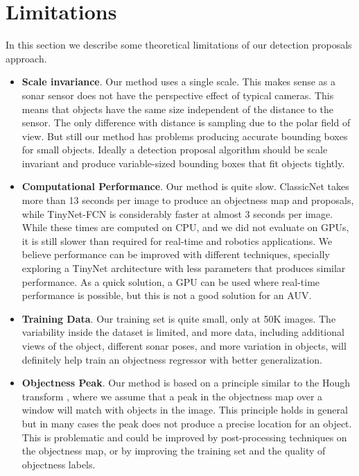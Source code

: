 \section{Limitations}

In this section we describe some theoretical limitations of our detection proposals approach.

\begin{itemize}
	\item \textbf{Scale invariance}. Our method uses a single scale. This makes sense as a sonar sensor does not have the perspective effect of typical cameras. This means that objects have the same size independent of the distance to the sensor. The only difference with distance is sampling due to the polar field of view. But still our method has problems producing accurate bounding boxes for small objects. Ideally a detection proposal algorithm should be scale invariant and produce variable-sized bounding boxes that fit objects tightly.
	\item \textbf{Computational Performance}. Our method is quite slow. ClassicNet takes more than 13 seconds per image to produce an objectness map and proposals, while TinyNet-FCN is considerably faster at almost 3 seconds per image. While these times are computed on CPU, and we did not evaluate on GPUs, it is still slower than required for real-time and robotics applications. We believe performance can be improved with different techniques, specially exploring a TinyNet architecture with less parameters that produces similar performance. As a quick solution, a GPU can be used where real-time performance is possible, but this is not a good solution for an AUV.
	\item \textbf{Training Data}. Our training set is quite small, only at 50K images. The variability inside the dataset is limited, and more data, including additional views of the object, different sonar poses, and more variation in objects, will definitely help train an objectness regressor with better generalization. 
	\item \textbf{Objectness Peak}. Our method is based on a principle similar to the Hough transform \cite{gonzalezDIP2006}, where we assume that a peak in the objectness map over a window will match with objects in the image. This principle holds in general but in many cases the peak does not produce a precise location for an object. This is problematic and could be improved by post-processing techniques on the objectness map, or by improving the training set and the quality of objectness labels.

\end{itemize}

